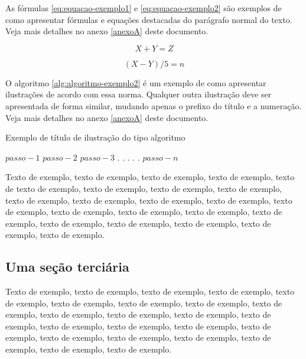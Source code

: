 \documentclass[
	12pt,				%
	oneside,			%
	a4paper,			%
	english,			%
	brazil				%
	]{abntex2ppgsi}
\begin{document}
As fórmulas \ref{eq:equacao-exemplo1} e \ref{eq:equacao-exemplo2} são exemplos de como apresentar fórmulas e equações destacadas do parágrafo normal do texto. Veja mais detalhes no anexo \ref{anexoA} deste documento.

\begin{equation}
  X + Y = Z
	\label{eq:equacao-exemplo1}
\end{equation}

\begin{equation}
  (X - Y)/5 = n
	\label{eq:equacao-exemplo2}
\end{equation}


O algoritmo \ref{alg:algoritmo-exemplo2} é um exemplo de como apresentar ilustrações de acordo com essa norma. Qualquer outra ilustração deve ser apresentada de forma similar, mudando apenas o prefixo do título e a numeração. Veja mais detalhes no anexo \ref{anexoA} deste documento.

\begin{algorithm}[htbp]
\caption{Exemplo de título de ilustração do tipo algoritmo}
\label{alg:algoritmo-exemplo2}
\begin{algorithmic}[1]
\State $passo-1$
\State $passo-2$
\State $passo-3$
\State $.$
\State $.$
\State $.$
\State $.$
\State $.$
\State $passo-n$
\EndProcedure
\end{algorithmic}
\end{algorithm}

Texto de exemplo, texto de exemplo, texto de exemplo, texto de exemplo, texto de texto de exemplo, texto de exemplo, texto de exemplo, texto de exemplo, texto de exemplo, texto de exemplo, texto de exemplo, texto de exemplo, texto de exemplo, texto de exemplo, texto de exemplo, texto de exemplo, texto de exemplo, texto de exemplo, texto de exemplo, texto de exemplo, texto de exemplo, texto de exemplo.

\subsection{Uma seção terciária}

Texto de exemplo, texto de exemplo, texto de exemplo, texto de exemplo, texto de exemplo, texto de exemplo, texto de exemplo, texto de exemplo, texto de exemplo, texto de exemplo, texto de exemplo, texto de exemplo, texto de exemplo, texto de exemplo, texto de exemplo, texto de exemplo, texto de exemplo, texto de exemplo, texto de exemplo, texto de exemplo, texto de exemplo, texto de exemplo, texto de exemplo.
\end{document}
